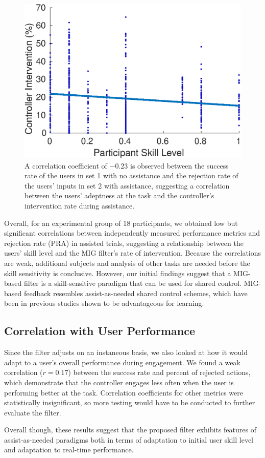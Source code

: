 \begin{figure}[!h]
	\begin{center}
		\includegraphics[width=0.8\columnwidth, keepaspectratio]{corr_plot_SKILLvsPAA.eps}\par
	\end{center}
	\caption{A correlation coefficient of $-0.23$ is observed between the success rate of the users in set 1 with no assistance and the rejection rate of the users' inputs in set 2 with assistance, suggesting a correlation between the users' adeptness at the task and the controller's intervention rate during assistance. }
	\label{fig: MDA_corr_dotproduct}
\end{figure}

Overall, for an experimental group of 18 participants, we obtained low but significant correlations \cite{cohen_statistics} between independently measured performance metrics and rejection rate (PRA) in assisted trials, suggesting a relationship between the users' skill level and the MIG filter's rate of intervention. Because the correlations are weak, additional subjects and analysis of other tasks are needed before the skill sensitivity is conclusive. However, our initial findings suggest that a MIG-based filter is a skill-sensitive paradigm that can be used for shared control. MIG-based feedback resembles assist-as-needed shared control schemes, which have been in previous studies shown to be advantageous for learning. 


\subsection{Correlation with User Performance}

Since the filter adjusts on an instaneous basis, we also looked at how it would adapt to a user's overall performance during engagement. We found a weak correlation ($r=0.17$) between the success rate and percent of rejected actions, which demonstrate that the controller engages less often when the user is performing better at the task. Correlation coefficients for other metrics were statistically insignificant, so more testing would have to be conducted to further evaluate the filter. 

Overall though, these results suggest that the proposed filter exhibits features of assist-as-needed paradigms both in terms of adaptation to initial user skill level and adaptation to real-time performance. 
